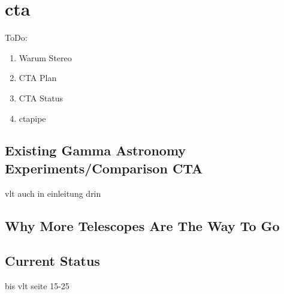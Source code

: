 \chapter{cta}\label{cta}

ToDo:
\begin{enumerate}
    \item Warum Stereo
    \item CTA Plan
    \item CTA Status
    \item ctapipe
\end{enumerate}

\section{Existing Gamma Astronomy Experiments/Comparison CTA}
vlt auch in einleitung drin

\section{Why More Telescopes Are The Way To Go}
\section{Current Status}


bis vlt seite 15-25
